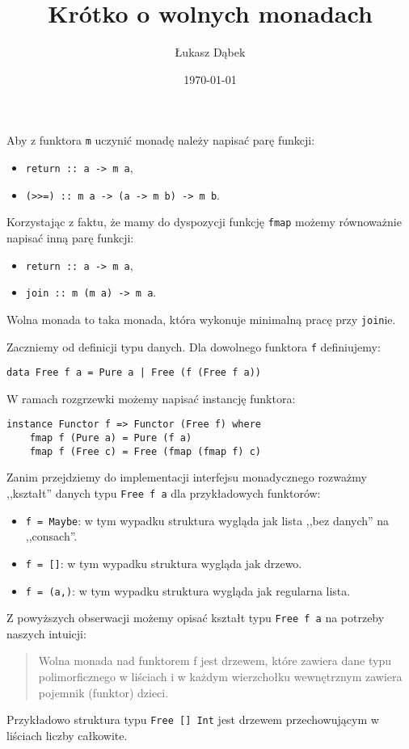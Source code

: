 \documentclass{article}[12pt]
\title{Krótko o wolnych monadach}
\author{Łukasz Dąbek}
\date{\today}
\begin{document}
\maketitle
Aby z funktora \texttt{m} uczynić monadę należy napisać parę funkcji:
\begin{itemize}
    \item \texttt{return :: a -> m a},
    \item \texttt{(>>=) :: m a -> (a -> m b) -> m b}.
\end{itemize}
Korzystając z faktu, że mamy do dyspozycji funkcję \texttt{fmap} możemy
równoważnie napisać inną parę funkcji:
\begin{itemize}
    \item \texttt{return :: a -> m a},
    \item \texttt{join :: m (m a) -> m a}.
\end{itemize}
Wolna monada to taka monada, która wykonuje minimalną pracę przy \texttt{join}ie.

Zaczniemy od definicji typu danych. Dla dowolnego funktora \texttt{f} definiujemy:
\begin{verbatim}
data Free f a = Pure a | Free (f (Free f a))
\end{verbatim}
W ramach rozgrzewki możemy napisać instancję funktora:
\begin{verbatim}
instance Functor f => Functor (Free f) where
    fmap f (Pure a) = Pure (f a)
    fmap f (Free c) = Free (fmap (fmap f) c)
\end{verbatim}

Zanim przejdziemy do implementacji interfejsu monadycznego rozważmy ,,kształt''
danych typu \texttt{Free f a} dla przykładowych funktorów:
\begin{itemize}
    \item \texttt{f = Maybe}: w tym wypadku struktura wygląda jak lista ,,bez danych'' na ,,consach''.
    \item \texttt{f = []}: w tym wypadku struktura wygląda jak drzewo.
    \item \texttt{f = (a,)}: w tym wypadku struktura wygląda jak regularna lista.
\end{itemize}

Z powyższych obserwacji możemy opisać kształt typu \texttt{Free f a} na potrzeby
naszych intuicji:
\begin{quotation}
Wolna monada nad funktorem f jest drzewem, które zawiera dane typu polimorficznego w
liściach i w każdym wierzchołku wewnętrznym zawiera pojemnik (funktor) dzieci.
\end{quotation}
Przykładowo struktura typu \texttt{Free [] Int} jest drzewem przechowującym
w liściach liczby całkowite.
\end{document}
